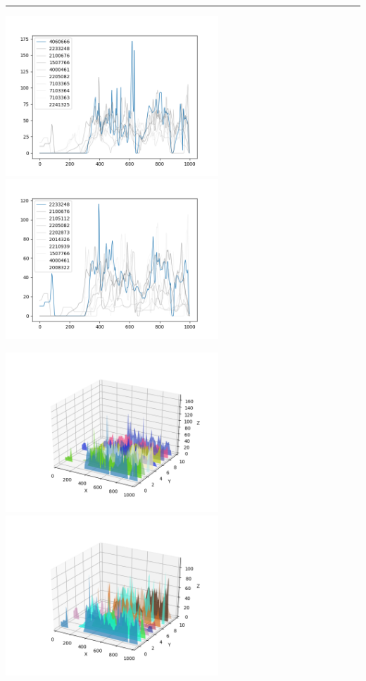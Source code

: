 \documentclass{article}
\begin{document}
\begin{center}
\noindent\rule{\textwidth}{1pt}

\includegraphics[height=6cm, width=8cm]{2.png}\includegraphics[height=6cm, width=8cm]{2_cos.png}

\includegraphics[height=6cm, width=8cm]{2_3d.png} \includegraphics[height=6cm, width=8cm]{2_cos_3d.png}


\end{center}
\end{document}
